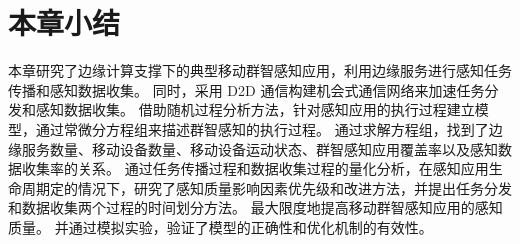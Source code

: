 
\section{本章小结}

本章研究了边缘计算支撑下的典型移动群智感知应用，利用边缘服务进行感知任务传播和感知数据收集。
同时，采用 D2D 通信构建机会式通信网络来加速任务分发和感知数据收集。
借助随机过程分析方法，针对感知应用的执行过程建立模型，通过常微分方程组来描述群智感知的执行过程。
通过求解方程组，找到了边缘服务数量、移动设备数量、移动设备运动状态、群智感知应用覆盖率以及感知数据收集率的关系。
通过任务传播过程和数据收集过程的量化分析，在感知应用生命周期定的情况下，研究了感知质量影响因素优先级和改进方法，并提出任务分发和数据收集两个过程的时间划分方法。
最大限度地提高移动群智感知应用的感知质量。
并通过模拟实验，验证了模型的正确性和优化机制的有效性。

